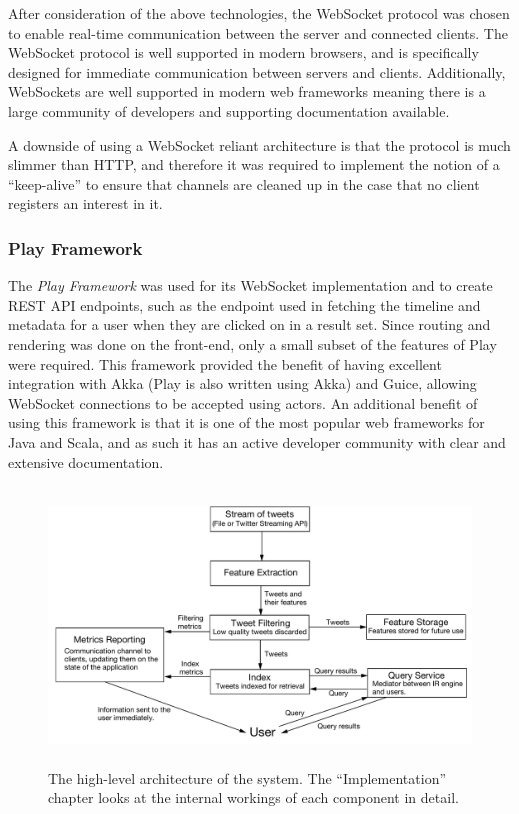 \documentclass{l4proj}
\begin{document}
       After consideration of the above technologies, the WebSocket protocol was chosen to enable real-time communication between the server and connected clients. The WebSocket protocol is well supported in modern browsers, and is specifically designed for immediate communication between servers and clients. Additionally, WebSockets are well supported in modern web frameworks meaning there is a large community of developers  and supporting documentation available.
          
        A downside of using a WebSocket reliant architecture is that the protocol is much slimmer than HTTP, and therefore it was required to implement the notion of a ``keep-alive'' to ensure that channels are cleaned up in the case that no client registers an interest in it.
        
                \subsubsection{Play Framework}
        The \textit{Play Framework} was used for its WebSocket implementation and to create REST API endpoints, such as the endpoint used in fetching the timeline and metadata for a user when they are clicked on in a result set. Since routing and rendering was done on the front-end, only a small subset of the features of Play were required. This framework provided the benefit of having excellent integration with Akka (Play is also written using Akka) and Guice, allowing WebSocket connections to be accepted using actors. An additional benefit of using this framework is that it is one of the most popular web frameworks for Java and Scala, and as such it has an active developer community with clear and extensive documentation.
        
\begin{figure}
\centering
\includegraphics[height=278px,width=496px]{architecture.pdf}
\caption{The high-level architecture of the system. The ``Implementation'' chapter looks at the internal workings of each component in detail.}
\label{architecture}
\end{figure}
\end{document}
